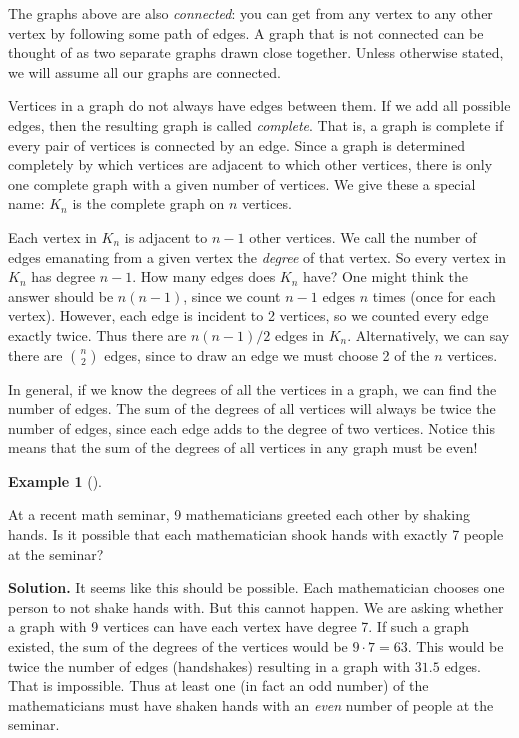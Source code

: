 \documentclass[10pt,]{book}
\theoremstyle{plain}
\theoremstyle{definition}
\newtheorem{example}[theorem]{Example}
\theoremstyle{definition}
\theoremstyle{definition}
\numberwithin{equation}{chapter}
\begin{document}
The graphs above are also \emph{connected}: you can get from any vertex to any other vertex by following some path of edges. A graph that is not connected can be thought of as two separate graphs drawn close together. Unless otherwise stated, we will assume all our graphs are connected.
%
\par

Vertices in a graph do not always have edges between them. If we add all possible edges, then the resulting graph is called \emph{complete}. That is, a graph is complete if every pair of vertices is connected by an edge. Since a graph is determined completely by which vertices are adjacent to which other vertices, there is only one complete graph with a given number of vertices. We give these a special name: \(K_n\) is the complete graph on \(n\) vertices.
%
\par

Each vertex in \(K_n\) is adjacent to \(n-1\) other vertices. We call the number of edges emanating from a given vertex the \emph{degree} of that vertex. So every vertex in \(K_n\) has degree \(n-1\). How many edges does \(K_n\) have? One might think the answer should be \(n(n-1)\), since we count \(n-1\) edges \(n\) times (once for each vertex). However, each edge is incident to 2 vertices, so we counted every edge exactly twice. Thus there are \(n(n-1)/2\) edges in \(K_n\).
Alternatively, we can say there are \({n \choose 2}\) edges, since to draw an edge we must choose 2 of the \(n\) vertices.
%
\par

In general, if we know the degrees of all the vertices in a graph, we can find the number of edges. The sum of the degrees of all vertices will always be twice the number of edges, since each edge adds to the degree of two vertices. Notice this means that the sum of the degrees of all vertices in any graph must be even!
%
\begin{example}[]\label{example-103}

At a recent math seminar, 9 mathematicians greeted each other by shaking hands. Is it possible that each mathematician shook hands with exactly 7 people at the seminar?
%
\par\medskip\noindent%
\textbf{Solution.}\quad
It seems like this should be possible. Each mathematician chooses one person to not shake hands with. But this cannot happen. We are asking whether a graph with 9 vertices can have each vertex have degree 7. If such a graph existed, the sum of the degrees of the vertices would be \(9\cdot 7 = 63\). This would be twice the number of edges (handshakes) resulting in a graph with \(31.5\) edges. That is impossible. Thus at least one (in fact an odd number) of the mathematicians must have shaken hands with an \emph{even} number of people at the seminar.
%
\end{example}
\par
\end{document}
